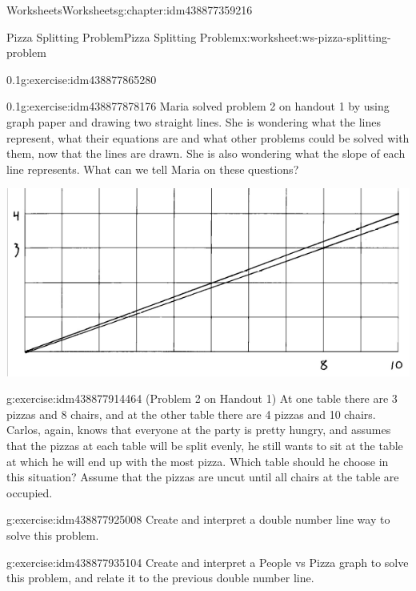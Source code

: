\documentclass[twoside,11pt,]{book}
\begin{document}
\begin{chapterptx}{Worksheets}{}{Worksheets}{}{}{g:chapter:idm438877359216}
\begin{worksheet-section-numberless}{Pizza Splitting Problem}{}{Pizza Splitting Problem}{}{}{x:worksheet:ws-pizza-splitting-problem}
\begin{divisionexercise}{3}{}{0.1}{g:exercise:idm438877865280}
\end{divisionexercise}%
\clearpage
\begin{divisionexercise}{4}{}{0.1}{g:exercise:idm438877878176}%
Maria solved problem 2 on handout 1 by using graph paper and drawing two straight lines.  She is wondering what the lines represent, what their equations are and what other problems could be solved with them, now that the lines are drawn.  She is also wondering what the slope of each line represents.  What can we tell Maria on these questions?%
\begin{sidebyside}{1}{0.05}{0.05}{0}%
\begin{sbspanel}{0.9}%
\includegraphics[width=1\linewidth]{images/pizza-splitting-problem.png}
\end{sbspanel}%
\end{sidebyside}%
\end{divisionexercise}%
\begin{divisionexercise}{5}{}{}{g:exercise:idm438877914464}%
(Problem 2 on Handout 1) At one table there are 3 pizzas and 8 chairs, and at the other table there are 4 pizzas and 10 chairs.  Carlos, again, knows that everyone at the party is pretty hungry, and assumes that the pizzas at each table will be split evenly, he still wants to sit at the table at which he will end up with the most pizza.  Which table should he choose in this situation? Assume that the pizzas are uncut until all chairs at the table are occupied.%
\end{divisionexercise}%
\begin{divisionexercise}{6}{}{}{g:exercise:idm438877925008}%
Create and interpret a double number line way to solve this problem.%
\end{divisionexercise}%
\begin{divisionexercise}{7}{}{}{g:exercise:idm438877935104}%
Create and interpret a People vs Pizza graph to solve this problem, and relate it to the previous double number line.%

\end{divisionexercise}
\end{worksheet-section-numberless}
\end{chapterptx}
\end{document}
